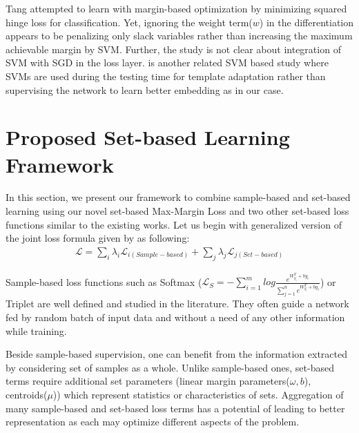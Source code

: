 \documentclass[10pt,twocolumn,letterpaper]{article}
\newcommand{\margin}{Max-Margin Loss\xspace}
\begin{document}
Tang \cite{tang2013deep} attempted to learn with margin-based optimization by minimizing squared hinge loss for classification. Yet, ignoring the weight term($w$) in the differentiation appears to be penalizing only slack variables rather than increasing the maximum achievable margin by SVM. Further, the study is not clear about integration of SVM with SGD in the loss layer. \cite{crosswhite2016template} is another related SVM based study where SVMs are used during the testing time for template adaptation rather than supervising the network to learn better embedding as in our case. 

\section{Proposed Set-based Learning Framework}


In this section, we present our framework to combine sample-based and set-based learning using our novel set-based \margin and two other set-based loss functions similar to the existing works. Let us begin with generalized version of the joint loss formula given by \cite{wen2016discriminative} as following:
\begin{align}
\mathcal{L} = \sum_i \lambda_i \mathcal{L}_{i(Sample-based)} + \sum_j \lambda_j \mathcal{L}_{j(Set-based)}
\end{align}

Sample-based loss functions such as Softmax ($\mathcal{L}_S = - \sum_{i=1}^m log \frac{e^{W^T_{y_i}+b{y_i}}}{\sum^n_{j=1} e^{W^T_{y_i}+b{y_i}}}$) or Triplet are well defined and studied in the literature\cite{schroff2015facenet,parkhi2015deep,sun2014deep}. They often guide a network fed by random batch of input data and without a need of any other information while training.

Beside sample-based supervision, one can benefit from the information extracted by considering set of samples as a whole. Unlike sample-based ones, set-based terms require additional set parameters (\eg linear margin parameters($\omega,b$), centroids($\mu$)) which represent statistics or characteristics of sets. Aggregation of many sample-based and set-based loss terms has a potential of leading to better representation as each may optimize different aspects of the problem.

\end{document}
